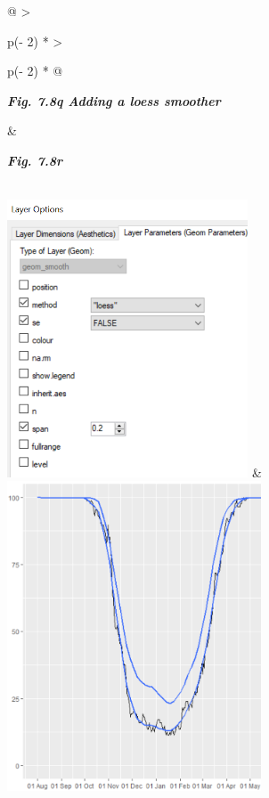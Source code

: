 \documentclass[
  letterpaper,
  DIV=11,
  numbers=noendperiod]{scrreprt}
\begin{document}
\begin{longtable}[]{@{}
  >{\raggedright\arraybackslash}p{(\columnwidth - 2\tabcolsep) * }
  >{\raggedright\arraybackslash}p{(\columnwidth - 2\tabcolsep) * }@{}}
\toprule\noalign{}
\begin{minipage}[b]{\linewidth}\raggedright
\textbf{\emph{Fig. 7.8q Adding a loess smoother}}
\end{minipage} & \begin{minipage}[b]{\linewidth}\raggedright
\textbf{\emph{Fig. 7.8r}}
\end{minipage} \\
\midrule\noalign{}
\endhead
\bottomrule\noalign{}
\endlastfoot
\includegraphics[width=2.81607in,height=3.24676in]{figures/Fig7.8q.png}
&
\includegraphics[width=2.97378in,height=3.62442in]{figures/Fig7.8r.png} \\
\end{longtable}
\end{document}
